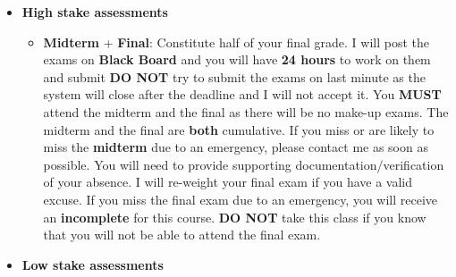 \documentclass[
]{book}
\providecommand{\tightlist}{%
  \setlength{\itemsep}{0pt}\setlength{\parskip}{0pt}}
\begin{document}
\begin{itemize}
\tightlist
\item
  \textbf{High stake assessments}

  \begin{itemize}
  \tightlist
  \item
    \textbf{Midterm} + \textbf{Final}: Constitute half of your final grade. I will post the exams on \textbf{Black Board} and you will have \textbf{24 hours} to work on them and submit \textbf{DO NOT} try to submit the exams on last minute as the system will close after the deadline and I will not accept it.
    You \textbf{MUST} attend the midterm and the final as there will be no make-up exams. The midterm and the final are \textbf{both} cumulative. If you miss or are likely to miss the \textbf{midterm} due to an emergency, please contact me as soon as possible. You will need to provide supporting documentation/verification of your absence. I will re-weight your final exam if you have a valid excuse. If you miss the final exam due to an emergency, you will receive an \textbf{incomplete} for this course. \textbf{DO NOT} take this class if you know that you will not be able to attend the final exam.
  \end{itemize}
\item
  \textbf{Low stake assessments}


\end{itemize}
\end{document}
